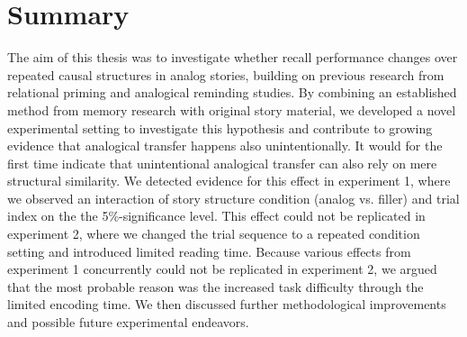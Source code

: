 \documentclass[a4paper,man,natbib,floatsintext,import]{apa6}
\begin{document}
\newpage
\section{Summary}
The aim of this thesis was to investigate whether recall performance changes over repeated causal structures in analog stories, building on previous research from relational priming and analogical reminding studies. By combining an established method from memory research with original story material, we developed a novel experimental setting to investigate this hypothesis and contribute to growing evidence that analogical transfer happens also unintentionally. It would for the first time indicate that unintentional analogical transfer can also rely on mere structural similarity. We detected evidence for this effect in experiment 1, where we observed an interaction of story structure condition (analog vs. filler) and trial index on the the 5\%-significance level. This effect could not be replicated in experiment 2, where we changed the trial sequence to a repeated condition setting and introduced limited reading time. Because various effects from experiment 1 concurrently could not be replicated in experiment 2, we argued that the most probable reason was the increased task difficulty through the limited encoding time. We then discussed further methodological improvements and possible future experimental endeavors.





\end{document}

